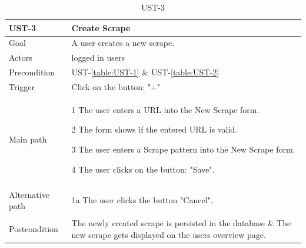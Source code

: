 \documentclass[titlepage, 12pt]{article}
\newenvironment{packed_itemize}{
  \vspace{-\topsep}
  \begin{itemize}
    \setlength{\itemsep}{1pt}
    \setlength{\parskip}{0pt}
    \setlength{\parsep}{0pt}
  }{\end{itemize}}
\begin{document}
\begin{table}[H]
  \begin{center}

    \begin{tabular}{p{4cm}|p{10cm}}
      \textbf{UST-3}   & \textbf{Create Scrape}                                                                                             \\
      \hline
      Goal             & A user creates a new scrape.                                                                                       \\
      \hline
      Actors           & logged in users                                                                                                    \\
      \hline
      Precondition     & UST-\ref{table:UST-1} \& UST-\ref{table:UST-2}                                                                     \\
      \hline
      Trigger          & Click on the button: "+"                                                                                           \\
      \hline
      Main path        &
      \begin{packed_itemize}
        \item [1] The user enters a URL into the New Scrape form.
        \item [2] The form shows if the entered URL is valid.
        \item [3] The user enters a Scrape pattern into the New Scrape form.
        \item [4] The user clicks on the button: "Save".
      \end{packed_itemize}                                                                                                             \\
      \hline
      Alternative path &
      \begin{packed_itemize}
        \item [1a] The user clicks the button "Cancel".
      \end{packed_itemize}                                                                                                             \\
      \hline
      Postcondition    & The newly created scrape is persisted in the database \& The new scrape gets displayed on the users overview page. \\
    \end{tabular}

    \caption{UST-3}
    \label{table:UST-3}

  \end{center}
\end{table}
\end{document}
